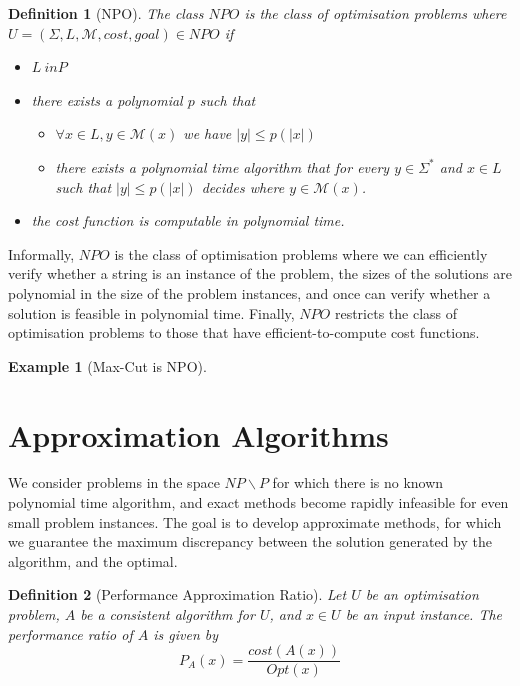 \documentclass[a4paper,10pt]{article}
\newtheorem{definition}{Definition}
\newtheorem{example}{Example}
\begin{document}
\begin{definition}[NPO] The class $NPO$ is the class of optimisation problems where  $U = (\Sigma, L, \mathcal{M}, cost, goal)\in NPO$ if 
\begin{itemize}
    \item $L \ in P$
    \item there exists a polynomial $p$ such that 
    \begin{itemize}
         \item $\forall x\in L, y \in \mathcal{M}(x)$ we have $|y|\leq p(|x|)$
        \item there exists a polynomial time algorithm that for every $y\in \Sigma^*$ and $x\in L$ such that $|y|\leq p(|x|)$ decides where $y\in\mathcal{M}(x)$.
    \end{itemize}
    \item the cost function is computable in polynomial time. 
\end{itemize}
\end{definition}
Informally, $NPO$ is the class of optimisation problems where we can efficiently verify whether a string is an instance of the problem, the sizes of the solutions are polynomial in the size of the problem instances, and once can verify whether a solution is feasible in polynomial time. Finally, $NPO$ restricts the class of optimisation problems to those that have efficient-to-compute cost functions. 

\begin{example}[Max-Cut is NPO]
    
\end{example}



\newpage
\section{Approximation Algorithms}
We consider problems in the space $NP \backslash P$ for which there is no known polynomial time algorithm, and exact methods become rapidly infeasible for even small problem instances. The goal is to develop approximate methods, for which we guarantee the maximum discrepancy between the solution generated by the algorithm, and the optimal. 

\begin{definition}[Performance Approximation Ratio]
    Let $U$ be an optimisation problem, $A$ be a consistent algorithm for $U$, and $x\in U$ be an input instance. The performance ratio of $A$ is given by 
    $$P_A(x) = \frac{cost(A(x))}{Opt(x)}$$
\end{definition}

\newpage

\end{document}
